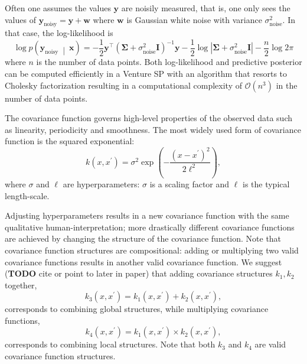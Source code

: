 \documentclass{article} %
\newcommand{\noisy}{{\textrm{noisy}}}
\newcommand{\noise}{{\textrm{noise}}}
\newcommand{\wbf}{\mathbf{w}}
\newcommand{\xbf}{\mathbf{x}}
\newcommand{\ybf}{\mathbf{y}}
\newcommand{\Ibf}{\mathbf{I}}
\newcommand{\pn}[1]{\left( #1 \right)}
\newcommand{\abs}[1]{\left\lvert #1 \right\rvert}
\newcommand{\mvert}{\ \middle\vert\ }
\begin{document}
Often one assumes the values $\ybf$ are noisily measured, that is, one only sees the values of $\ybf_\noisy = \ybf + \wbf$ where $\wbf$ is Gaussian white noise with variance $\sigma_\noise^2$.
In that case, the log-likelihood is
\begin{equation}
\log p\pn{\ybf_\noisy \mvert \xbf} =
-\frac12 \ybf^\top (\bm{\Sigma}
+ \sigma_\noise^2 \Ibf)^{-1} \ybf
- \frac12\log \abs{\bm{\Sigma} + \sigma_\noise^2 \Ibf}
- \frac{n}{2}\log 2\pi
\end{equation}
where $n$ is the number of data points.
Both log-likelihood and predictive posterior can be computed efficiently in a Venture SP with an algorithm that resorts to Cholesky factorization\citep[chap. 2]{rasmussen2006gaussian} resulting in a computational complexity of $\mathcal{O}(n^3)$ in the number of data points.



The covariance function governs high-level properties of the observed data such as linearity, periodicity and smoothness.
The most widely used form of covariance function is the squared exponential:
\begin{equation}
  k(x,x^\prime) = \sigma^2 \exp\pn{-\frac{(x-x^\prime)^2}{2\ell^2}},
\end{equation}
where $\sigma$ and $\ell$ are hyperparameters: $\sigma$ is a scaling factor and $\ell$ is the typical length-scale.

Adjusting hyperparameters results in a new covariance function with the same qualitative human-interpretation; more drastically different covariance functions are achieved by changing the structure of the covariance function.
Note that covariance function structures are compositional: adding or multiplying two valid covariance functions results in another valid covariance function.
We suggest ({\bf TODO} cite or point to later in paper) that adding covariance structures $k_1,k_2$ together,
\begin{equation}
k_3(x,x^\prime) = k_1(x,x^\prime) + k_2(x,x^\prime),
\end{equation}
corresponds to combining global structures, while multiplying covariance functions,
\begin{equation}
k_4(x,x^\prime) = k_1(x,x^\prime) \times k_2(x,x^\prime),
\end{equation}
corresponds to combining local structures.
Note that both $k_3$ and $k_4$ are valid covariance function structures.
\end{document}
